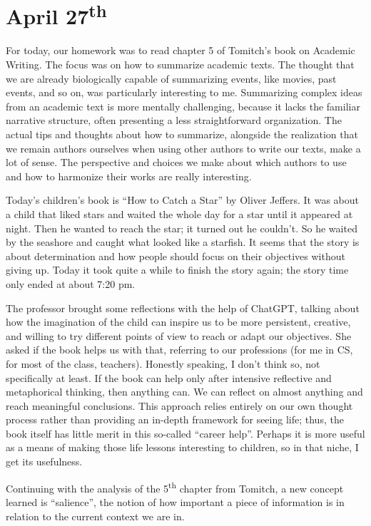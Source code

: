 \section[April 27th]{April 27\textsuperscript{th}}

For today, our homework was to read chapter 5 of Tomitch's book on Academic Writing. The focus was on how to summarize academic texts. The thought that we are already biologically capable of summarizing events, like movies, past events, and so on, was particularly interesting to me. Summarizing complex ideas from an academic text is more mentally challenging, because it lacks the familiar narrative structure, often presenting a less straightforward organization. The actual tips and thoughts about how to summarize, alongside the realization that we remain authors ourselves when using other authors to write our texts, make a lot of sense. The perspective and choices we make about which authors to use and how to harmonize their works are really interesting.

Today's children's book is ``How to Catch a Star'' by Oliver Jeffers. It was about a child that liked stars and waited the whole day for a star until it appeared at night. Then he wanted to reach the star; it turned out he couldn't. So he waited by the seashore and caught what looked like a starfish. It seems that the story is about determination and how people should focus on their objectives without giving up. Today it took quite a while to finish the story again; the story time only ended at about 7:20 pm.

The professor brought some reflections with the help of ChatGPT, talking about how the imagination of the child can inspire us to be more persistent, creative, and willing to try different points of view to reach or adapt our objectives. She asked if the book helps us with that, referring to our professions (for me in CS, for most of the class, teachers). Honestly speaking, I don't think so, not specifically at least. If the book can help only after intensive reflective and metaphorical thinking, then anything can. We can reflect on almost anything and reach meaningful conclusions. This approach relies entirely on our own thought process rather than providing an in-depth framework for seeing life; thus, the book itself has little merit in this so-called ``career help''. Perhaps it is more useful as a means of making those life lessons interesting to children, so in that niche, I get its usefulness.

Continuing with the analysis of the 5\textsuperscript{th} chapter from Tomitch, a new concept learned is ``salience'', the notion of how important a piece of information is in relation to the current context we are in.


